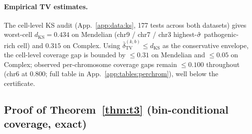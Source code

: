 \paragraph{Empirical TV estimates.}
The cell-level KS audit (App.~\ref{app:data:ks}, 177 tests across both datasets) gives worst-cell $d_{\mathrm{KS}} = 0.434$ on Mendelian (chr9 / chr7 / chr3 highest-$\hat{\sigma}$ pathogenic-rich cell) and $0.315$ on Complex. Using $\bar\delta_{\mathrm{TV}}^{(k,b)} \leq d_{\mathrm{KS}}$ as the conservative envelope, the cell-level coverage gap is bounded by $\leq 0.31$ on Mendelian and $\leq 0.05$ on Complex; observed per-chromosome coverage gaps remain $\leq 0.100$ throughout (chr6 at $0.800$; full table in App.~\ref{app:tables:perchrom}), well below the certificate.


\subsection{Proof of Theorem~\ref{thm:t3} (bin-conditional coverage, exact)}
\label{app:proofs:t3}

